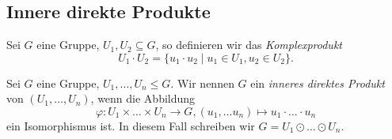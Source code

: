 \subsection{Innere direkte Produkte}

\begin{definition}\label{def:komplexprodukt}
    Sei $G$ eine Gruppe, $U_1, U_2 \subseteq G$, so definieren wir das \emph{Komplexprodukt}
    $$ U_1 \cdot U_2 = \{ u_1 \cdot u_2 \mid u_1 \in U_1, u_2 \in U_2 \}. $$
\end{definition}

\begin{definition} \label{def:direktes-inneres-produkt}
    Sei $G$ eine Gruppe, $U_1, \hdots, U_n \leq G$. Wir nennen $G$ ein \emph{inneres direktes Produkt} von $(U_1, \hdots, U_n)$, wenn die Abbildung
    $$ \varphi : U_1 \times \hdots \times U_n \to G, (u_1, \hdots u_n) \mapsto u_1 \cdot \hdots \cdot u_n $$
    ein Isomorphismus ist. In diesem Fall schreiben wir $G = U_1 \odot \hdots \odot U_n$.
\end{definition}

